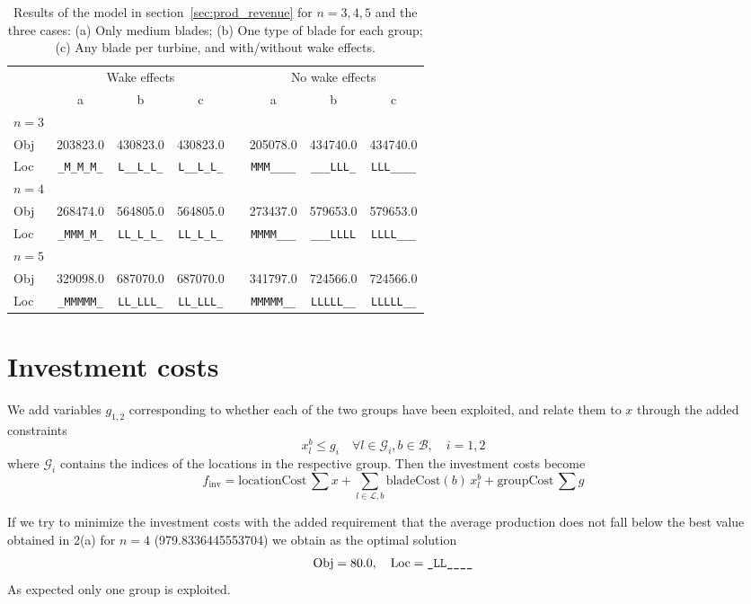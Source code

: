\documentclass{article}
\renewcommand{\arraystretch}{1.2}
\begin{document}
\begin{table}
	\centering
	\caption{Results of the model in section~\ref{sec:prod_revenue} for $n=3,4,5$ and the three cases:
	(a) Only medium blades;
	(b) One type of blade for each group;
	(c) Any blade per turbine,
	and with/without wake effects. \label{tab:2_res}}
	\renewcommand{\arraystretch}{1.2}
	\begin{tabular}{@{}l ccc c ccc@{}}
		\toprule
		& \multicolumn{3}{c}{Wake effects} && \multicolumn{3}{c}{No wake effects} \\
		\cmidrule{2-4} \cmidrule{6-8}
		& a & b & c && a & b & c \\ \midrule
		$n=3$ \\
		Obj & 203823.0 & 430823.0 & 430823.0 && 205078.0 & 434740.0 & 434740.0 \\
		Loc & \verb+_M_M_M_+ & \verb+L__L_L_+ & \verb+L__L_L_+ &&
		\verb+MMM____+ & \verb+___LLL_+ & \verb+LLL____+ \\

		$n=4$ \\
		Obj & 268474.0 & 564805.0 & 564805.0 && 273437.0 & 579653.0 & 579653.0 \\
		Loc & \verb+_MMM_M_+ & \verb+LL_L_L_+ & \verb+LL_L_L_+ &&
		\verb+MMMM___+ & \verb+___LLLL+ & \verb+LLLL___+ \\

		$n=5$ \\
		Obj & 329098.0 & 687070.0 & 687070.0 && 341797.0 & 724566.0 & 724566.0 \\
		Loc & \verb+_MMMMM_+ & \verb+LL_LLL_+ & \verb+LL_LLL_+ &&
		\verb+MMMMM__+ & \verb+LLLLL__+ & \verb+LLLLL__+ \\
		\bottomrule
	\end{tabular}
\end{table}

\section{Investment costs}
We add variables $g_{1,2}$ corresponding to whether each of the two groups
have been exploited,
and relate them to $x$ through the added constraints
$$ x_l^b \le g_i \quad \forall l \in \mathcal G_i, b \in \mathcal B, \quad i=1,2$$
where $\mathcal G_i$ contains the indices of the locations
in the respective group.
Then the investment costs become
$$ f_\text{inv} = \text{locationCost} \, \sum x + \sum_{l \in \mathcal L, b} \text{bladeCost}(b) \, x_l^b + \text{groupCost} \, \sum g $$

If we try to minimize the investment costs with the added requirement
that the average production does not fall below
the best value obtained in 2(a) for $n=4$
(\num[round-mode=places,round-precision=2]{979.8336445553704})
we obtain as the optimal solution
$$ \text{Obj} = 80.0, \quad \text{Loc} = \verb+_LL____+ $$
As expected only one group is exploited.
\end{document}

